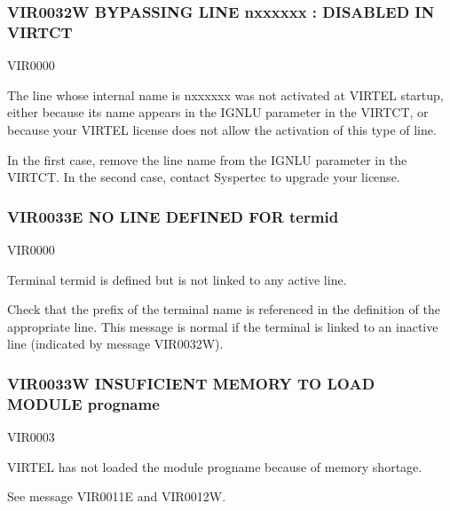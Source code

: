 \documentclass[letterpaper,10pt,english]{sphinxmanual}
\begin{document}
\subsubsection{VIR0032W BYPASSING LINE n\sphinxhyphen{}xxxxxx : DISABLED IN VIRTCT}
\label{\detokenize{messages:vir0032w-bypassing-line-n-xxxxxx-disabled-in-virtct}}\begin{description}
\sphinxAtStartPar
VIR0000

\sphinxAtStartPar
The line whose internal name is n\sphinxhyphen{}xxxxxx was not activated at VIRTEL startup, either because its name appears in the IGNLU parameter in the VIRTCT, or because your VIRTEL license does not allow the activation of this type of line.

\sphinxAtStartPar
In the first case, remove the line name from the IGNLU parameter in the VIRTCT. In the second case, contact Syspertec to upgrade your license.

\end{description}


\subsubsection{VIR0033E NO LINE DEFINED FOR termid}
\label{\detokenize{messages:vir0033e-no-line-defined-for-termid}}\begin{description}
\sphinxAtStartPar
VIR0000

\sphinxAtStartPar
Terminal termid is defined but is not linked to any active line.

\sphinxAtStartPar
Check that the prefix of the terminal name is referenced in the definition of the appropriate line. This message is normal if the terminal is linked to an inactive line (indicated by message VIR0032W).

\end{description}


\subsubsection{VIR0033W INSUFICIENT MEMORY TO LOAD MODULE progname}
\label{\detokenize{messages:vir0033w-insuficient-memory-to-load-module-progname}}\begin{description}
\sphinxAtStartPar
VIR0003

\sphinxAtStartPar
VIRTEL has not loaded the module progname because of memory shortage.

\sphinxAtStartPar
See message VIR0011E and VIR0012W.

\end{description}
\end{document}
